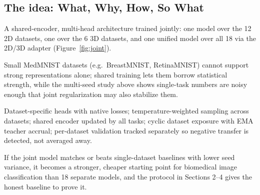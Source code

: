 \documentclass[11pt,a4paper]{article}
\begin{document}
\subsection{The idea: What, Why, How, So What}

\begin{description}[nosep]
    \item[What.] A shared-encoder, multi-head architecture trained jointly:
    one model over the 12 2D datasets, one over the 6 3D datasets, and one
    unified model over all 18 via the 2D/3D adapter (Figure~\ref{fig:joint}).
    \item[Why.] Small MedMNIST datasets (e.g.\ BreastMNIST, RetinaMNIST) cannot
    support strong representations alone; shared training lets them borrow
    statistical strength, while the multi-seed study above shows single-task
    numbers are noisy enough that joint regularization may also stabilize
    them.
    \item[How.] Dataset-specific heads with native losses; temperature-weighted
    sampling across datasets; shared encoder updated by all tasks; cyclic
    dataset exposure with EMA teacher accrual; per-dataset validation tracked
    separately so negative transfer is detected, not averaged away.
    \item[So What.] If the joint model matches or beats single-dataset
    baselines with lower seed variance, it becomes a stronger, cheaper
    starting point for biomedical image classification than 18 separate
    models, and the protocol in Sections 2--4 gives the honest baseline to
    prove it.
\end{description}
\end{document}
